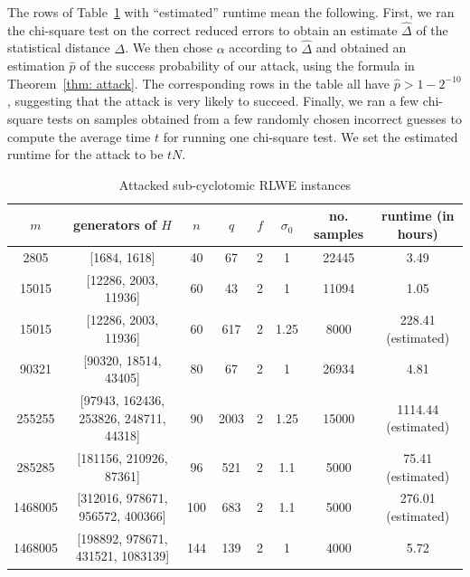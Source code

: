 \documentclass[envcountsame]{llncs}
\begin{document}
The rows of Table~\ref{tab: attacked} with ``estimated'' runtime mean the following. First, we ran the chi-square test on the correct reduced errors to obtain an estimate $\hat{\Delta}$ of the statistical distance $\Delta$. We then chose $\alpha$ according to $\hat{\Delta}$ and obtained an estimation $\hat{p}$ of the success probability of our attack, using the formula in Theorem~\ref{thm: attack}.  The corresponding rows in the table all have $\hat{p} > 1 - 2^{-10}$, suggesting that the attack is very likely to succeed.  Finally, we ran a few chi-square tests on samples obtained from a few randomly chosen incorrect guesses to compute the average time $t$ for running one chi-square test. We set the estimated runtime for the attack to be $tN$.

\begin{table}
\caption{Attacked sub-cyclotomic RLWE instances}
\label{tab: attacked}
\begin{center}
\begin{tabular}{c|c|c|c|c|c|c|c}
$m$ & generators of $H$ & $n$ & $q$ & $f$ & $\sigma_0$ & no. samples & runtime (in hours) \\ \hline
2805 &  [1684, 1618] & 40 & 67 & 2 & 1 & 22445 & 3.49 \\
15015 & [12286, 2003, 11936] & 60 & 43 & 2 & 1 & 11094 & 1.05 \\
15015 & [12286, 2003, 11936] & 60 & 617 & 2 & 1.25 & 8000 & 228.41 (estimated)  \\
90321 & [90320, 18514, 43405] & 80 & 67 & 2 & 1 & 26934 & 4.81 \\
255255 &  [97943, 162436, 253826, 248711, 44318] & 90 & 2003 & 2 & 1.25 & 15000 &  1114.44 (estimated) \\
285285 & [181156, 210926, 87361] & 96 & 521  & 2 & 1.1 & 5000 & 75.41 (estimated) \\
1468005 & [312016, 978671, 956572, 400366] & 100 & 683 & 2 & 1.1
& 5000 &  276.01 (estimated) \\
1468005 & [198892, 978671, 431521, 1083139] & 144 & 139 & 2 & 1 &  4000 &  5.72
\end{tabular}
\end{center}
\end{table}

\end{document}
